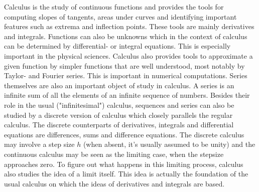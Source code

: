 Calculus is the study of continuous functions and provides the tools for computing slopes of tangents, areas under curves and identifying important features such as extrema and inflection points. These tools are mainly derivatives and integrals. Functions can also be unknowns which in the context of calculus can be determined by differential- or integral equations. This is especially important in the physical sciences. Calculus also provides tools to approximate a given function by simpler functions that are well understood, most notably by Taylor- and Fourier series. This is important in numerical computations. Series themselves are also an important object of study in calculus. A series is an infinite sum of all the elements of an infinite sequence of numbers. Besides their role in the usual ("infinitesimal") calculus, sequences and series can also be studied by a discrete version of calculus which closely parallels the regular calculus. The discrete counterparts of derivatives, integrals and differential equations are differences, sums and difference equations. The discrete calculus may involve a step size $h$ (when absent, it's usually assumed to be unity) and the continuous calculus may be seen as the limiting case, when the stepsize approaches zero. To figure out what happens in this limiting process, calculus also studies the idea of a limit itself. This idea is actually the foundation of the usual calculus on which the ideas of derivatives and integrals are based.